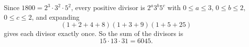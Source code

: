Since $1800=2^3\cdot3^2\cdot5^2$, every positive divisor is $2^a3^b5^c$ with $0\le a\le3$, $0\le b\le2$, $0\le c\le2$, and expanding
\[\left(1+2+4+8\right)\left(1+3+9\right)\left(1+5+25\right)\]
gives each divisor exactly once. So the sum of the divisors is
\[15\cdot13\cdot31=\boxed{6045}.\]
